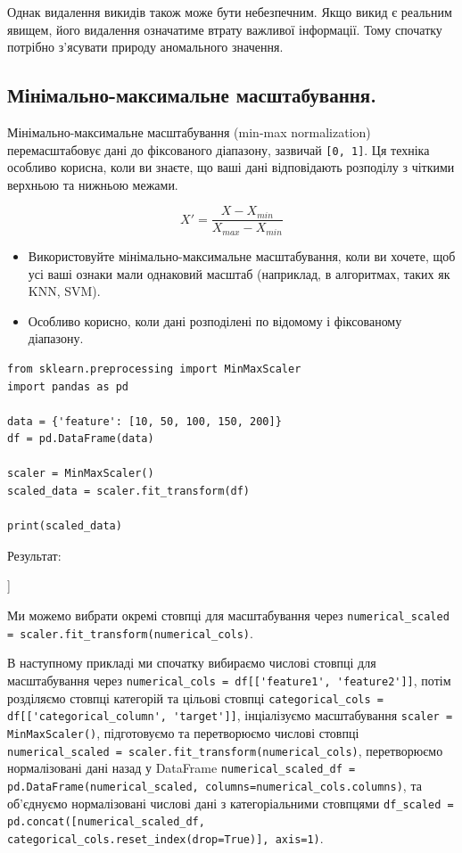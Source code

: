 Однак видалення викидів також може бути небезпечним. Якщо викид є реальним явищем, його видалення означатиме втрату важливої інформації. Тому спочатку потрібно з'ясувати природу аномального значення.

\subsection{Мінімально-максимальне масштабування.}

Мінімально-максимальне масштабування (min-max normalization) перемасштабовує дані до фіксованого діапазону, зазвичай \verb|[0, 1]|. Ця техніка особливо корисна, 
коли ви знаєте, що ваші дані відповідають розподілу з чіткими верхньою та нижньою межами.

$$X' = \frac{X-X_{min}}{X_{max}-X_{min}}$$

\begin{itemize}
\item Використовуйте мінімально-максимальне масштабування, коли ви хочете, щоб усі ваші ознаки 
мали однаковий масштаб (наприклад, в алгоритмах, таких як KNN, SVM).
\item Особливо корисно, коли дані розподілені по відомому і фіксованому діапазону.
\end{itemize}

\begin{lstlisting}
from sklearn.preprocessing import MinMaxScaler
import pandas as pd

data = {'feature': [10, 50, 100, 150, 200]}
df = pd.DataFrame(data)

scaler = MinMaxScaler()
scaled_data = scaler.fit_transform(df)

print(scaled_data)
\end{lstlisting}

Результат:

\begin{console}
[[0.        ]
 [0.21052632]
 [0.47368421]
 [0.73684211]
 [1.        ]]
\end{console}

Ми можемо вибрати окремі стовпці для масштабування через 
\verb|numerical_scaled = scaler.fit_transform(numerical_cols)|. 

В наступному прикладі ми спочатку 
вибираємо числові стовпці для масштабування через 
\verb|numerical_cols = df[['feature1', 'feature2']]|, потім розділяємо стовпці категорій та цільові 
стовпці
\verb|categorical_cols = df[['categorical_column', 'target']]|,
інціалізуємо масштабування 
\verb|scaler = MinMaxScaler()|,
підготовуємо та перетворюємо числові стовпці
\verb|numerical_scaled = scaler.fit_transform(numerical_cols)|,
перетворюємо нормалізовані дані назад у DataFrame 
\verb|numerical_scaled_df = pd.DataFrame(numerical_scaled, columns=numerical_cols.columns)|,
та об’єднуємо нормалізовані числові дані з категоріальними стовпцями
\verb|df_scaled = pd.concat([numerical_scaled_df, categorical_cols.reset_index(drop=True)], axis=1)|.

